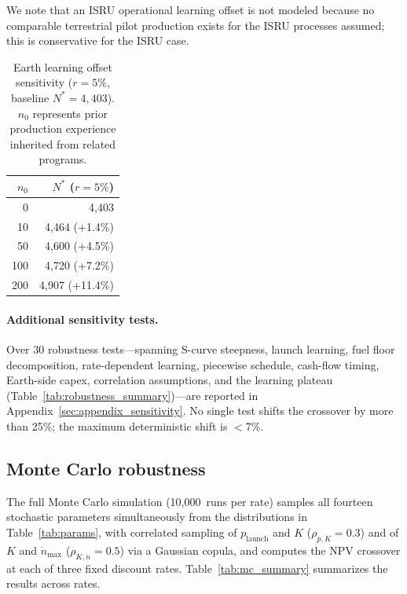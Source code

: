 \documentclass[preprint,12pt]{elsarticle}
\begin{document}
We note that an ISRU operational learning offset is not modeled because no comparable terrestrial pilot production exists for the ISRU processes assumed; this is conservative for the ISRU case.

\begin{table}[htbp]
\centering
\caption{Earth learning offset sensitivity ($r = 5\%$, baseline $N^* = 4{,}403$). $n_0$ represents prior production experience inherited from related programs.}
\label{tab:earth_n0}
\small
\begin{tabular}{@{}rr@{}}
\toprule
$n_0$ & $N^*$ ($r = 5\%$) \\
\midrule
0   & 4{,}403 \\
10  & 4{,}464 (+1.4\%) \\
50  & 4{,}600 (+4.5\%) \\
100 & 4{,}720 (+7.2\%) \\
200 & 4{,}907 (+11.4\%) \\
\bottomrule
\end{tabular}
\end{table}

\paragraph{Additional sensitivity tests.} Over 30 robustness tests---spanning S-curve steepness, launch learning, fuel floor decomposition, rate-dependent learning, piecewise schedule, cash-flow timing, Earth-side capex, correlation assumptions, and the learning plateau (Table~\ref{tab:robustness_summary})---are reported in Appendix~\ref{sec:appendix_sensitivity}. No single test shifts the crossover by more than 25\%; the maximum deterministic shift is $<$7\%.

\subsection{Monte Carlo robustness}
\label{sec:mc_robustness}

The full Monte Carlo simulation (10{,}000~runs per rate) samples all fourteen stochastic parameters simultaneously from the distributions in Table~\ref{tab:params}, with correlated sampling of $p_{\mathrm{launch}}$ and $K$ ($\rho_{p,K} = 0.3$) and of $K$ and $\dot{n}_{\max}$ ($\rho_{K,\dot{n}} = 0.5$) via a Gaussian copula, and computes the NPV crossover at each of three fixed discount rates. Table~\ref{tab:mc_summary} summarizes the results across rates.
\end{document}
